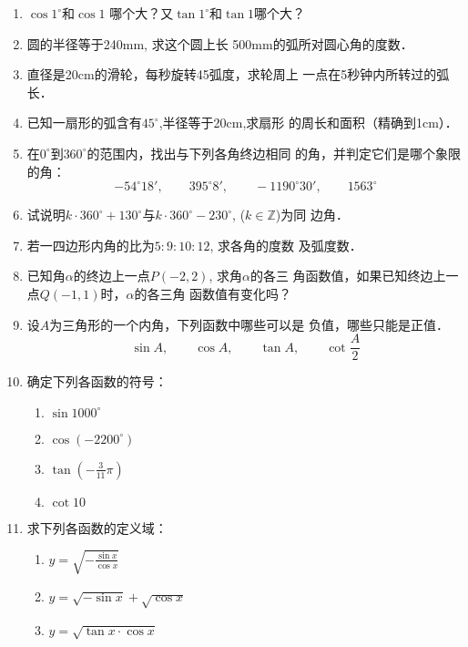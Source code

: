 \begin{enumerate}

    
    \item    $\cos1^{\circ}$和$\cos1$
    哪个大？又$\tan1^{\circ}$和$\tan 1$哪个大？
    \item 圆的半径等于240mm, 求这个圆上长
    500mm的弧所对圆心角的度数．
    \item 直径是20cm的滑轮，每秒旋转45弧度，求轮周上
    一点在5秒钟内所转过的弧长．
    \item 已知一扇形的弧含有$45^{\circ}$,半径等于20cm,求扇形
    的周长和面积（精确到1cm）．
    \item 在$0^{\circ}$到$360^{\circ}$的范围内，找出与下列各角终边相同
    的角，并判定它们是哪个象限的角：
\[-54^{\circ}18',\qquad 395^{\circ}8',\qquad -1190^{\circ}30',\qquad 1563^{\circ}\]

\item 试说明$k\cdot 360^{\circ}+130^{\circ}$与$k\cdot 360^{\circ}-230^{\circ}$, ($k\in\mathbb{Z}$)为同
边角．
\item 若一四边形内角的比为$5:9:10:12$, 求各角的度数
及弧度数．
\item 已知角$\alpha$的终边上一点$P(-2,2)$, 求角$\alpha$的各三
角函数值，如果已知终边上一点$Q(-1,1)$时，$\alpha$的各三角
函数值有变化吗？
\item 设$A$为三角形的一个内角，下列函数中哪些可以是
负值，哪些只能是正值．
\[\sin A,\qquad \cos A,\qquad \tan A,\qquad \cot\frac{A}{2}\]
\item 确定下列各函数的符号：
\begin{multicols}{2}
\begin{enumerate}
    \item $\sin1000^{\circ}$
    \item $\cos(-2200^{\circ})$
    \item $\tan\left(-\frac{3}{11}\pi\right)$
    \item $\cot 10$
\end{enumerate}
\end{multicols}

\item 求下列各函数的定义域：
\begin{multicols}{2}
    \begin{enumerate}
        \item $y=\sqrt{-\frac{\sin x}{\cos x}}$
        \item $y=\sqrt{-\sin x}+\sqrt{\cos x}$
        \item $y=\sqrt{\tan x\cdot \cos x}$
    \end{enumerate}
    \end{multicols}


\end{enumerate}
